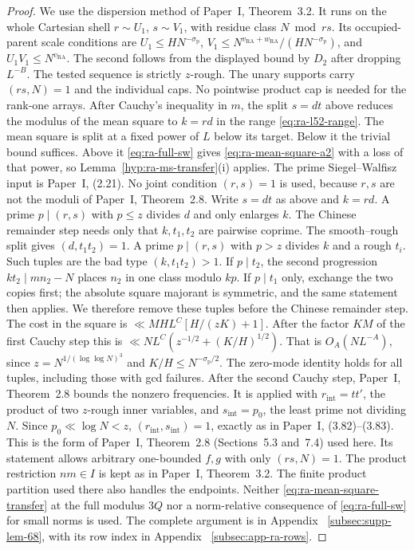 \begin{proof}
We use the dispersion method of Paper~I, Theorem~3.2.
It runs on the
whole Cartesian shell \(r\sim U_1\), \(s\sim V_1\), with residue class
\(N\bmod rs\). Its occupied-parent scale conditions are
\(U_1\le HN^{-\sigma_{\mathrm p}}\),
\(V_1\le N^{v_{\mathrm{RA}}+w_{\mathrm{RA}}}/(HN^{-\sigma_{\mathrm p}})\), and
\(U_1V_1\le N^{v_{\mathrm{RA}}}\).
The second follows from the displayed
bound by \(D_2\) after dropping \(L^{-B}\). The tested sequence is
strictly \(z\)-rough. The unary supports carry \((rs,N)=1\) and the
individual caps. No pointwise product cap is needed for the rank-one
arrays.
After Cauchy's inequality in \(m\), the split \(s=dt\) above reduces the
modulus of the mean square to \(k=rd\) in the range
\eqref{eq:ra-l52-range}. The mean square is split at a fixed power of
\(L\) below its target. Below it the trivial bound suffices. Above it
\eqref{eq:ra-full-sw} gives \eqref{eq:ra-mean-square-a2} with a loss of
that power, so Lemma~\ref{hyp:ra-ms-transfer}(i) applies. The
prime Siegel--Walfisz input is Paper~I, (2.21). No joint condition \((r,s)=1\) is used, because \(r,s\) are not the
moduli of Paper~I, Theorem~2.8. Write \(s=dt\) as above and \(k=rd\). A
prime \(p\mid(r,s)\) with \(p\le z\) divides \(d\) and only enlarges \(k\).
The Chinese remainder step needs only that \(k,t_1,t_2\) are pairwise
coprime.
The smooth--rough split gives \((d,t_1t_2)=1\). A prime
\(p\mid(r,s)\) with \(p>z\) divides \(k\) and a rough \(t_i\). Such tuples
are the bad type \((k,t_1t_2)>1\). If \(p\mid t_2\), the second progression
\(kt_2\mid mn_2-N\) places \(n_2\) in one class modulo \(kp\). If
\(p\mid t_1\) only, exchange the two copies first; the absolute square
majorant is symmetric, and the same statement then applies. We therefore
remove these tuples before the Chinese remainder step.
The cost in the square is
\(\ll MHL^C[H/(zK)+1]\). After the factor \(KM\) of the
first Cauchy step this is
\(\ll NL^C(z^{-1/2}+(K/H)^{1/2})\).
That is \(O_A(NL^{-A})\), since
\(z=N^{1/(\log\log N)^3}\) and \(K/H\le N^{-\sigma_{\mathrm p}/2}\).
The zero-mode identity holds for all tuples, including those with gcd
failures. After the second Cauchy step, Paper~I, Theorem~2.8 bounds the nonzero
frequencies. It is applied with \(r_{\mathrm{int}}=tt'\), the product of two
\(z\)-rough inner variables, and \(s_{\mathrm{int}}=p_0\), the least prime not dividing
\(N\). Since \(p_0\ll\log N<z\), \((r_{\mathrm{int}},s_{\mathrm{int}})=1\), exactly as in Paper~I,
(3.82)--(3.83). This is the form of Paper~I, Theorem~2.8
(Sections~5.3 and~7.4) used here. Its statement allows arbitrary one-bounded
\(f,g\) with only \((rs,N)=1\). The product restriction
\(nm\in I\) is kept as in Paper~I, Theorem~3.2.
The finite product
partition used there also handles the endpoints.
Neither \eqref{eq:ra-mean-square-transfer} at the full modulus \(3Q\) nor
a norm-relative consequence of \eqref{eq:ra-full-sw} for small norms is
used. The complete argument is in Appendix~
\hyperref[subsec:supp-lem-68]{\ref*{subsec:supp-lem-68}}, with its
row index in Appendix~
\hyperref[subsec:app-ra-rows]{\ref*{subsec:app-ra-rows}}.
\end{proof}


